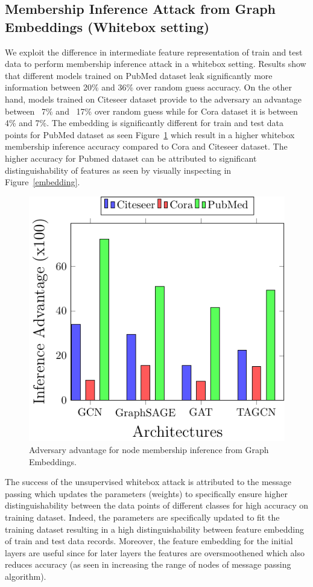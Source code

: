 \subsection{Membership Inference Attack from Graph Embeddings {\large(Whitebox setting)}}

We exploit the difference in intermediate feature representation of train and test data to perform membership inference attack in a whitebox setting.
Results show that different models trained on PubMed dataset leak significantly more information between 20\% and 36\% over random guess accuracy.
On the other hand, models trained on Citeseer dataset provide to the adversary an advantage between ~7\% and ~17\% over random guess while for Cora dataset it is between 4\% and 7\%.
The embedding is significantly different for train and test data points for PubMed dataset as seen Figure~\ref{fig:whitebox} which result in a higher whitebox membership inference accuracy compared to Cora and Citeseer dataset.
The higher accuracy for Pubmed dataset can be attributed to significant distinguishability of features as seen by visually inspecting in Figure~\ref{embedding}.

\begin{figure}
  \begin{center}
    \includegraphics[width=0.5\linewidth]{figures/EmbeddingMIA/whiteboxMIA.pdf}
  \end{center}
  \caption{Adversary advantage for node membership inference from Graph Embeddings.}
  \label{fig:whitebox}
\end{figure}



\noindent The success of the unsupervised whitebox attack is attributed to the message passing which updates the parameters (weights) to specifically ensure higher distinguishability between the data points of different classes for high accuracy on training dataset.
Indeed, the parameters are specifically updated to fit the training dataset resulting in a high distinguishability between feature embedding of train and test data records.
Moreover, the feature embedding for the initial layers are useful since for later layers the features are oversmoothened which also reduces accuracy (as seen in increasing the range of nodes of message passing algorithm).




